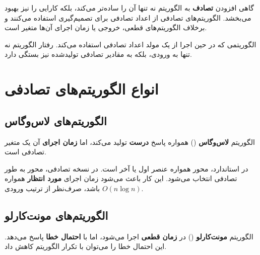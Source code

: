 \documentclass{matinbook}
\begin{document}
    گاهی افزودن \textbf{تصادف} به الگوریتم
    نه تنها آن را ساده‌تر می‌کند،
    بلکه کارایی را نیز بهبود می‌بخشد.
    الگوریتم‌های تصادفی
    از اعداد تصادفی برای تصمیم‌گیری استفاده می‌کنند
    و برخلاف الگوریتم‌های قطعی،
    خروجی یا زمان اجرای آن‌ها متغیر است.
    
    \begin{definition}
        الگوریتمی که در حین اجرا
        از یک مولد اعداد تصادفی استفاده می‌کند.
        رفتار الگوریتم نه تنها به ورودی،
        بلکه به مقادیر تصادفی تولیدشده نیز بستگی دارد.
        \label{def:randomized-algorithm}
    \end{definition}
    
    \section{انواع الگوریتم‌های تصادفی}
    
    \subsection{الگوریتم‌های لاس‌وگاس}
    
    \begin{definition}
        الگوریتم \textbf{لاس‌وگاس}
        () همواره پاسخ \textbf{درست}
        تولید می‌کند، اما \textbf{زمان اجرای} آن
        یک متغیر تصادفی است.
        \label{def:las-vegas}
    \end{definition}
    
    \begin{example}
        در  استاندارد،
        محور همواره عنصر اول یا آخر است.
        در نسخه تصادفی، محور به طور تصادفی
        انتخاب می‌شود. این کار باعث می‌شود
        زمان اجرای \textbf{مورد انتظار}
        همواره $O(n \log n)$ باشد،
        صرف‌نظر از ترتیب ورودی.
        \label{ex:randomized-quicksort}
    \end{example}
    
    \subsection{الگوریتم‌های مونت‌کارلو}
    
    \begin{definition}
        الگوریتم \textbf{مونت‌کارلو}
        () در \textbf{زمان قطعی}
        اجرا می‌شود، اما با \textbf{احتمال خطا}
        پاسخ می‌دهد. این احتمال خطا را می‌توان
        با تکرار الگوریتم کاهش داد.
        \label{def:monte-carlo}
    \end{definition}
    
\end{document}
